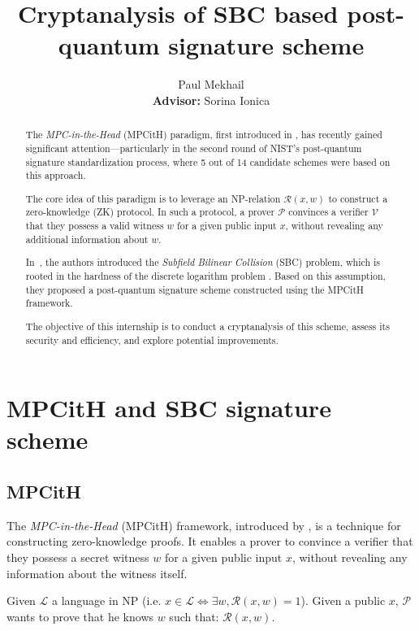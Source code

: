 \documentclass[english]{article}
\author{Paul Mekhail\\ \textbf{Advisor:} Sorina Ionica}
\title{Cryptanalysis of SBC based post-quantum signature scheme}
\begin{document}
	\maketitle
	
	\begin{abstract}
		The \emph{MPC-in-the-Head} (MPCitH) paradigm, first introduced in \cite{IKOS07}, has recently gained significant attention—particularly in the second round of NIST’s post-quantum signature standardization process, where 5 out of 14 candidate schemes were based on this approach.
		
		The core idea of this paradigm is to leverage an NP-relation $\mathcal{R}(x, w)$ to construct a zero-knowledge (ZK) protocol. In such a protocol, a prover $\mathcal{P}$ convinces a verifier $\mathcal{V}$ that they possess a valid witness $w$ for a given public input $x$, without revealing any additional information about $w$.
		
		In~\cite{HJ23}, the authors introduced the \emph{Subfield Bilinear Collision} (SBC) problem, which is rooted in the hardness of the discrete logarithm problem \cite{Joux13}. Based on this assumption, they proposed a post-quantum signature scheme constructed using the MPCitH framework.
		
		The objective of this internship is to conduct a cryptanalysis of this scheme, assess its security and efficiency, and explore potential improvements.
	\end{abstract}
		
	\section{MPCitH and SBC signature scheme}
		
		\subsection{MPCitH}
		
		The \emph{MPC-in-the-Head} (MPCitH) framework, introduced by \cite{IKOS07}, is a technique for constructing zero-knowledge proofs. It enables a prover to convince a verifier that they possess a secret witness $w$ for a given public input $x$, without revealing any information about the witness itself.
		
		Given $\mathcal{L}$ a language in NP (i.e. $x \in \mathcal{L} \Longleftrightarrow \exists w, \mathcal{R}(x, w) = 1$). Given a public $x$, $\mathcal{P}$ wants to prove that he knows $w$ such that: $\mathcal{R}(x, w)$.
		
\end{document}
